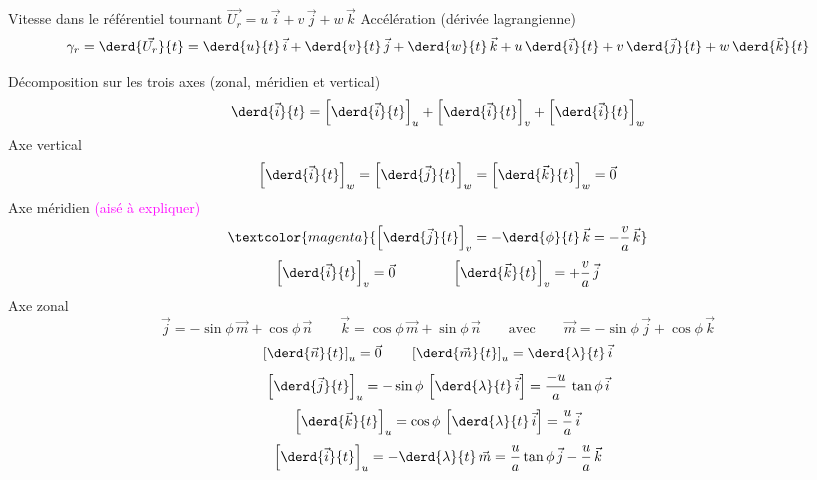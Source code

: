 \sk
Vitesse dans le référentiel tournant $\vec{U_r} = u\,\vec{i} + v\,\vec{j} + w\,\vec{k} $
\noindent Accélération (dérivée lagrangienne)
\[
\gamma_r = \derd{\vec{U_r}}{t}=\derd{u}{t}\,\vec{i}+\derd{v}{t}\,\vec{j}+\derd{w}{t}\,\vec{k} +u\,\derd{\vec{i}}{t}+v\,\derd{\vec{j}}{t}+w\,\derd{\vec{k}}{t}
\]


\sk
Décomposition sur les trois axes (zonal, méridien et vertical)
\[
\derd{\vec{i}}{t} = \left[ \derd{\vec{i}}{t} \right]_u + \left[ \derd{\vec{i}}{t} \right]_v + \left[ \derd{\vec{i}}{t} \right]_w
\]
\noindent Axe vertical
\[
\left[ \derd{\vec{i}}{t} \right]_w = \left[ \derd{\vec{j}}{t} \right]_w = \left[ \derd{\vec{k}}{t} \right]_w = \vec{0}
\]
\noindent Axe méridien \textcolor{magenta}{(aisé à expliquer)}
\[
\textcolor{magenta}{\left[ \derd{\vec{j}}{t} \right]_v = - \derd{\phi}{t} \, \vec{k} = - \dfrac{v}{a} \, \vec{k}}
\]
\[
\left[ \derd{\vec{i}}{t} \right]_v = \vec{0}
\qquad \qquad
\left[ \derd{\vec{k}}{t} \right]_v = + \dfrac{v}{a} \, \vec{j}
\]
\noindent Axe zonal
\[
\vec{j} = -\sin\phi \, \vec{m} + \cos\phi \, \vec{n} \qquad \vec{k} =  \cos\phi \, \vec{m} + \sin\phi \, \vec{n} \qquad \textrm{avec} \qquad \vec{m} = -\sin\phi \, \vec{j} + \cos\phi \, \vec{k}
\]
\[
\left[ \derd{\vec{n}}{t} \right]_u = \vec{0} \qquad \left[ \derd{\vec{m}}{t} \right]_u = \derd{\lambda}{t} \, \vec{i}
\]
\[
\left[ \derd{\vec{j}}{t} \right]_u = -\sin\phi \, \left[ \derd{\lambda}{t} \, \vec{i} \right] = \dfrac{-u}{a} \, \tan\phi \, \vec{i}
\]
\[
\left[ \derd{\vec{k}}{t} \right]_u =  \cos\phi \, \left[ \derd{\lambda}{t} \, \vec{i} \right] = \dfrac{u}{a} \, \vec{i}
\]
\[
\left[ \derd{\vec{i}}{t} \right]_u = - \derd{\lambda}{t} \, \vec{m} = \dfrac{u}{a} \tan\phi \, \vec{j} - \dfrac{u}{a} \,\vec{k}
\]

